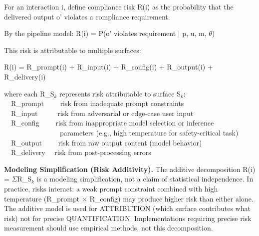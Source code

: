 \begin{cdef}
For an interaction i, define compliance risk R(i) as the probability that the delivered output o' violates a compliance requirement.

By the pipeline model: R(i) = P(o' violates requirement | p, u, m, $\theta$)

This risk is attributable to multiple surfaces:

R(i) = R\_\allowbreak{}prompt(i) + R\_\allowbreak{}input(i) + R\_\allowbreak{}config(i) + R\_\allowbreak{}output(i) + R\_\allowbreak{}delivery(i)

\begin{cladnote}
where each R\_S$_k$ represents risk attributable to surface S$_k$:\\
~~R\_prompt~~~~\textemdash{} risk from inadequate prompt constraints\\
~~R\_input~~~~~\textemdash{} risk from adversarial or edge-case user input\\
~~R\_config~~~~\textemdash{} risk from inappropriate model selection or inference\\
~~~~~~~~~~~~~~~~parameters (e.g., high temperature for safety-critical task)\\
~~R\_output~~~~\textemdash{} risk from raw output content (model behavior)\\
~~R\_delivery~~\textemdash{} risk from post-processing errors\\
\end{cladnote}
\smallskip\noindent\textbf{Modeling Simplification (Risk Additivity).}
The additive decomposition R(i) = $\Sigma$R\_\allowbreak{}S$_k$ is a modeling simplification, not a claim of statistical independence. In practice, risks interact:
a weak prompt constraint combined with high temperature (R\_\allowbreak{}prompt $\times$ R\_\allowbreak{}config) may produce higher risk than either alone. The additive model is used for ATTRIBUTION (which surface contributes what risk) not for precise QUANTIFICATION. Implementations requiring precise risk measurement should use empirical methods, not this decomposition.


\end{cdef}
